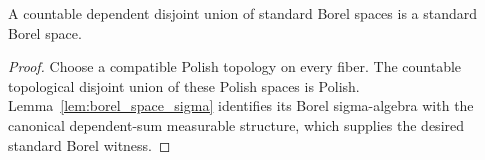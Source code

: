 \begin{lemma}
  \label{lem:standard_borel_space_sigma_countable}
  A countable dependent disjoint union of standard Borel spaces is a standard
  Borel space.
\end{lemma}

\begin{proof}

\leanok
  Choose a compatible Polish topology on every fiber.  The countable
  topological disjoint union of these Polish spaces is Polish.
  Lemma~\ref{lem:borel_space_sigma} identifies its Borel sigma-algebra with the
  canonical dependent-sum measurable structure, which supplies the desired
  standard Borel witness.
\end{proof}
